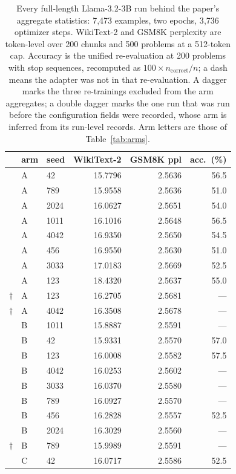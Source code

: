 \documentclass[11pt,letterpaper]{article}
\begin{document}
\begin{table}[htbp]
\centering
\small
\caption{Every full-length Llama-3.2-3B run behind the paper's aggregate statistics: 7{,}473 examples, two epochs, 3{,}736 optimizer steps. WikiText-2 and GSM8K perplexity are token-level over 200 chunks and 500 problems at a 512-token cap. Accuracy is the unified re-evaluation at 200 problems with stop sequences, recomputed as $100 \times n_{\mathrm{correct}}/n$; a dash means the adapter was not in that re-evaluation. A dagger marks the three re-trainings excluded from the arm aggregates; a double dagger marks the one run that was run before the configuration fields were recorded, whose arm is inferred from its run-level records. Arm letters are those of Table~\ref{tab:arms}.}
\label{tab:allruns}
\begin{tabular}{cllrrr}
\toprule
& arm & seed & WikiText-2 & GSM8K ppl & acc.\ (\%) \\
\midrule
 & A & 42 & 15.7796 & 2.5636 & 56.5 \\
 & A & 789 & 15.9558 & 2.5636 & 51.0 \\
 & A & 2024 & 16.0627 & 2.5651 & 54.0 \\
 & A & 1011 & 16.1016 & 2.5648 & 56.5 \\
 & A & 4042 & 16.9350 & 2.5650 & 54.5 \\
 & A & 456 & 16.9550 & 2.5630 & 51.0 \\
 & A & 3033 & 17.0183 & 2.5669 & 52.5 \\
 & A & 123 & 18.4320 & 2.5637 & 55.0 \\
$\dagger$ & A & 123 & 16.2705 & 2.5681 & --- \\
$\dagger$ & A & 4042 & 16.3508 & 2.5678 & --- \\
\midrule
 & B & 1011 & 15.8887 & 2.5591 & --- \\
 & B & 42 & 15.9331 & 2.5570 & 57.0 \\
 & B & 123 & 16.0008 & 2.5582 & 57.5 \\
 & B & 4042 & 16.0253 & 2.5602 & --- \\
 & B & 3033 & 16.0370 & 2.5580 & --- \\
 & B & 789 & 16.0927 & 2.5570 & --- \\
 & B & 456 & 16.2828 & 2.5557 & 52.5 \\
 & B & 2024 & 16.3029 & 2.5560 & --- \\
$\dagger$ & B & 789 & 15.9989 & 2.5591 & --- \\
\midrule
 & C & 42 & 16.0717 & 2.5586 & 52.5 \\

\end{tabular}
\end{table}
\end{document}
